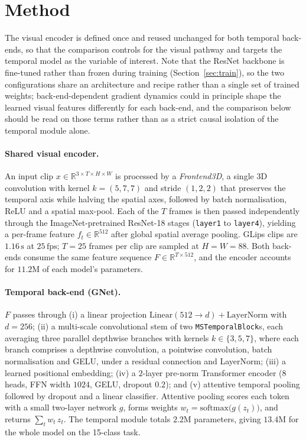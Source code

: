 \documentclass[10pt, a4paper]{article}
\begin{document}
\section{Method}
\label{sec:arch}
\noindent The visual encoder is defined once and reused unchanged for both temporal back-ends, so that the comparison controls for the visual pathway and targets the temporal model as the variable of interest. Note that the ResNet backbone is fine-tuned rather than frozen during training (Section~\ref{sec:train}), so the two configurations share an architecture and recipe rather than a single set of trained weights; back-end-dependent gradient dynamics could in principle shape the learned visual features differently for each back-end, and the comparison below should be read on those terms rather than as a strict causal isolation of the temporal module alone.
\paragraph{Shared visual encoder.}
An input clip $x \in \mathbb{R}^{3 \times T \times H \times W}$ is processed by a \emph{Frontend3D}, a single 3D convolution with kernel $k=(5,7,7)$ and stride $(1,2,2)$ that preserves the temporal axis while halving the spatial axes, followed by batch normalisation, ReLU and a spatial max-pool. Each of the $T$ frames is then passed independently through the ImageNet-pretrained ResNet-18 stages (\texttt{layer1} to \texttt{layer4}), yielding a per-frame feature $f_t \in \mathbb{R}^{512}$ after global spatial average pooling. GLips clips are $1.16\,\mathrm{s}$ at $25\,\mathrm{fps}$; $T = 25$ frames per clip are sampled at $H = W = 88$. Both back-ends consume the same feature sequence $F \in \mathbb{R}^{T \times 512}$, and the encoder accounts for $11.2$M of each model's parameters.
\paragraph{Temporal back-end (GNet).}
$F$ passes through (i) a linear projection $\mathrm{Linear}(512 \to d) + \mathrm{LayerNorm}$ with $d = 256$; (ii) a multi-scale convolutional stem of two \texttt{MSTemporalBlock}s, each averaging three parallel depthwise branches with kernels $k \in \{3,5,7\}$, where each branch comprises a depthwise convolution, a pointwise convolution, batch normalisation and GELU, under a residual connection and LayerNorm; (iii) a learned positional embedding; (iv) a $2$-layer pre-norm Transformer encoder ($8$ heads, FFN width $1024$, GELU, dropout $0.2$); and (v) attentive temporal pooling followed by dropout and a linear classifier. Attentive pooling scores each token with a small two-layer network $g$, forms weights $w_t = \mathrm{softmax}\big(g(z_t)\big)$, and returns $\sum_t w_t\, z_t$. The temporal module totals $2.2$M parameters, giving $13.4$M for the whole model on the 15-class task.
\end{document}

